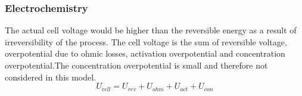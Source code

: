 \subsubsection{Electrochemistry} 
The actual cell voltage would be higher than the reversible energy  as a result of irreversibility of the process. The cell voltage is the sum of reversible voltage, overpotential due to ohmic losses, activation overpotential and concentration overpotential.The concentration overpotential is small and therefore not considered in this model.
\begin{equation} 
U_{cell}=U_{rev}+U_{ohm}+U_{act}+U_{con}
\end{equation} 


